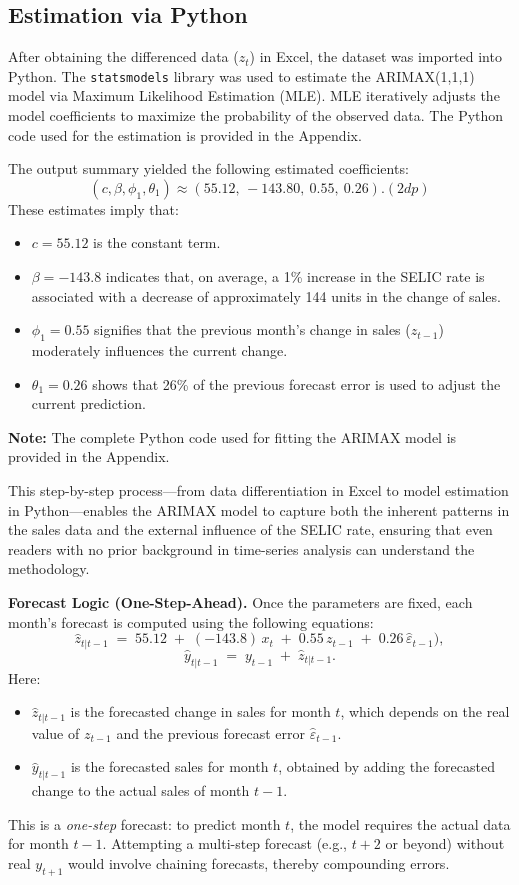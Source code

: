 \documentclass[10pt]{article}
\begin{document}
\subsection{Estimation via Python}
After obtaining the differenced data (\(z_t\)) in Excel, the dataset was imported into Python. The \texttt{statsmodels} library was used to estimate the ARIMAX(1,1,1) model via Maximum Likelihood Estimation (MLE). MLE iteratively adjusts the model coefficients to maximize the probability of the observed data. The Python code used for the estimation is provided in the Appendix. 


The output summary yielded the following estimated coefficients:
\[
(c,\beta,\phi_1,\theta_1) \approx (55.12,\,-143.80,\ 0.55,\ 0.26). (2dp)
\]
These estimates imply that:
\begin{itemize}
    \item \(c = 55.12\) is the constant term.
    \item \(\beta = -143.8\) indicates that, on average, a 1\% increase in the SELIC rate is associated with a decrease of approximately 144 units in the change of sales.
    \item \(\phi_1 = 0.55\) signifies that the previous month’s change in sales (\(z_{t-1}\)) moderately influences the current change.
    \item \(\theta_1 = 0.26\) shows that 26\% of the previous forecast error is used to adjust the current prediction.
\end{itemize}

\textbf{Note:} The complete Python code used for fitting the ARIMAX model is provided in the Appendix.

This step-by-step process—from data differentiation in Excel to model estimation in Python—enables the ARIMAX model to capture both the inherent patterns in the sales data and the external influence of the SELIC rate, ensuring that even readers with no prior background in time-series analysis can understand the methodology.


\textbf{Forecast Logic (One-Step-Ahead).}  
Once the parameters are fixed, each month’s forecast is computed using the following equations:
\[
\hat{z}_{t|t-1} \;=\; 55.12 \;+\; (-143.8)\,x_t \;+\; 0.55\,z_{t-1} \;+\; 0.26\,\hat{\varepsilon}_{t-1}),
\]
\begin{equation}  
\hat{y}_{t|t-1} \;=\; y_{t-1} \;+\; \hat{z}_{t|t-1}.
\end{equation}
Here:
\begin{itemize}
    \item \(\hat{z}_{t|t-1}\) is the forecasted change in sales for month \(t\), which depends on the real value of \(z_{t-1}\) and the previous forecast error \(\hat{\varepsilon}_{t-1}\).
    \item \(\hat{y}_{t|t-1}\) is the forecasted sales for month \(t\), obtained by adding the forecasted change to the actual sales of month \(t-1\).
\end{itemize}
This is a \emph{one-step} forecast: to predict month \(t\), the model requires the actual data for month \(t-1\). Attempting a multi-step forecast (e.g., \(t+2\) or beyond) without real \(y_{t+1}\) would involve chaining forecasts, thereby compounding errors.
\end{document}
